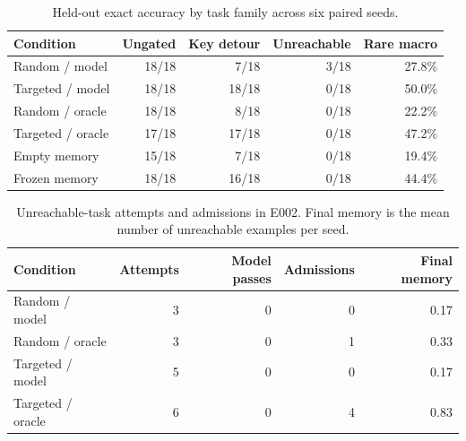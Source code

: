 \begin{table}[H]
\centering
\caption{Held-out exact accuracy by task family across six paired seeds.}
\label{tab:e002-accuracy}
\begin{tabular}{lrrrr}
\toprule
Condition & Ungated & Key detour & Unreachable & Rare macro \\
\midrule
Random / model & 18/18 & 7/18 & 3/18 & 27.8\% \\
Targeted / model & 18/18 & 18/18 & 0/18 & 50.0\% \\
Random / oracle & 18/18 & 8/18 & 0/18 & 22.2\% \\
Targeted / oracle & 17/18 & 17/18 & 0/18 & 47.2\% \\
Empty memory & 15/18 & 7/18 & 0/18 & 19.4\% \\
Frozen memory & 18/18 & 16/18 & 0/18 & 44.4\% \\
\bottomrule
\end{tabular}
\end{table}

\begin{table}[H]
\centering
\caption{Unreachable-task attempts and admissions in E002. Final memory is the mean number of unreachable examples per seed.}
\label{tab:e002-coverage}
\begin{tabular}{lrrrr}
\toprule
Condition & Attempts & Model passes & Admissions & Final memory \\
\midrule
Random / model & 3 & 0 & 0 & 0.17 \\
Random / oracle & 3 & 0 & 1 & 0.33 \\
Targeted / model & 5 & 0 & 0 & 0.17 \\
Targeted / oracle & 6 & 0 & 4 & 0.83 \\
\bottomrule
\end{tabular}
\end{table}
